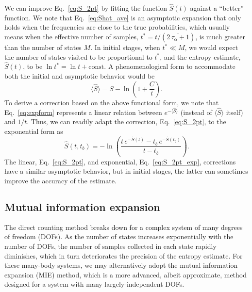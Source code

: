 \documentclass[reprint, superscriptaddress]{revtex4-1}
\begin{document}

We can improve Eq.~\eqref{eq:S_2pt} by
fitting the function $\hat S(t)$ against a ``better'' function.
%
We note that Eq.~\eqref{eq:Shat_ave} is an asymptotic expansion
that only holds when the frequencies are close to the true probabilities,
which usually means when the effective number of samples,
$t^* = t/(\overline{2 \, \tau_\alpha + 1})$, is much greater than
the number of states $M$.
%
In initial stages, when $t^* \ll M$,
we would expect the number of states visited to be proportional to $t^*$,
and the entropy estimate, $\hat S(t)$,
to be $\ln t^* = \ln t + \mathrm{const.}$
%
A phenomenological form to accommodate both the initial and asymptotic behavior
would be
%
\begin{equation}
  \bigl\langle \hat S \bigr\rangle
  = S - \ln\left(1 + \frac{C}{t}\right)
  .
  \label{eq:expform}
\end{equation}
%
To derive a correction based on the above functional form,
we note that Eq.~\eqref{eq:expform} represents a linear relation between
$e^{-\bigl\langle \hat S \bigr\rangle}$
(instead of $\bigl\langle \hat S \bigr\rangle$ itself)
and $1/t$.
%
Thus, we can readily adapt the correction, Eq.~\eqref{eq:S_2pt},
to the exponential form as
%
\begin{equation}
  \hat S(t, t_b) = -\ln\left(
    \frac{ t \, e^{-\hat S(t)} - t_b \, e^{-\hat S(t_b)} }
         { t - t_b }
  \right)
  .
  \label{eq:S_2pt_exp}
\end{equation}
%
The linear, Eq.~\eqref{eq:S_2pt}, and exponential, Eq.~\eqref{eq:S_2pt_exp}, corrections
have a similar asymptotic behavior,
but in initial stages, the latter can sometimes
improve the accuracy of the estimate.



\subsection{Mutual information expansion}


The direct counting method breaks down
for a complex system of many degrees of freedom (DOFs).
%
As the number of states increases exponentially with the number of DOFs,
the number of samples collected in each state rapidly diminishes,
which in turn deteriorates the precision of the entropy estimate.
%
For these many-body systems,
we may alternatively adopt
the mutual information expansion (MIE) method,
which is a more advanced, albeit approximate, method designed for a system
with many largely-independent DOFs.
\end{document}
